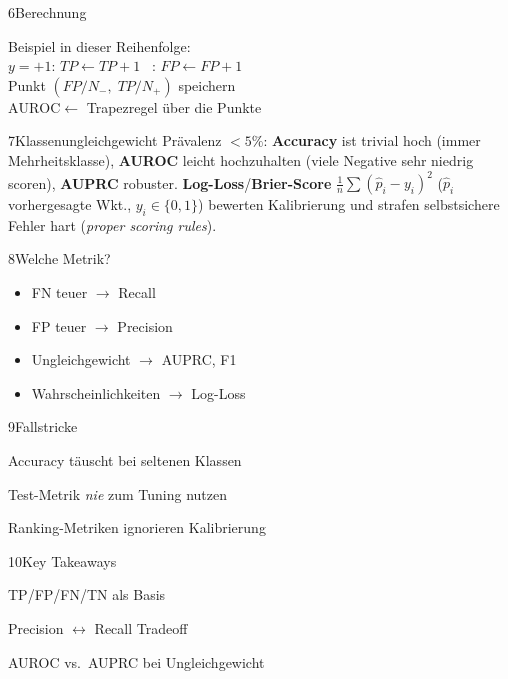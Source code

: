 \begin{hngrid}
\begin{hnp}[raster multicolumn=3,acc=hnrose]{6}{Berechnung}
\begin{pcode}
 Beispiel in dieser Reihenfolge:\\
\hii {} $y=+1$: $TP\leftarrow TP+1$ \ : $FP\leftarrow FP+1$\\
\hii Punkt $(FP/N_-,\;TP/N_+)$ speichern \ \\
$\mathrm{AUROC}\leftarrow$ Trapezregel über die Punkte
\end{pcode}
\end{hnp}
%
\begin{hnp}[raster multicolumn=2,acc=hnpurple]{7}{Klassenungleichgewicht}
Prävalenz $<5\%$: \textbf{Accuracy} ist trivial hoch (immer Mehrheitsklasse), \textbf{AUROC} leicht hochzuhalten (viele Negative sehr niedrig scoren), \textbf{AUPRC} robuster. \textbf{Log-Loss}/\textbf{Brier-Score} $\frac1n\sum(\hat p_i-y_i)^2$ ($\hat p_i$ vorhergesagte Wkt., $y_i\in\{0,1\}$) bewerten Kalibrierung und strafen selbstsichere Fehler hart (\emph{proper scoring rules}).
\end{hnp}
%
\begin{hnp}[raster multicolumn=2,acc=hnteal]{8}{Welche Metrik?}
\begin{itemize}
\item FN teuer $\to$ Recall
\item FP teuer $\to$ Precision
\item Ungleichgewicht $\to$ AUPRC, F1
\item Wahrscheinlichkeiten $\to$ Log-Loss
\end{itemize}
\end{hnp}
%
\begin{hnp}[raster multicolumn=2,acc=hnred]{9}{Fallstricke}
\begin{hncon}
\item Accuracy täuscht bei seltenen Klassen
\item Test-Metrik \emph{nie} zum Tuning nutzen
\item Ranking-Metriken ignorieren Kalibrierung
\end{hncon}
\end{hnp}
%
\begin{hnp}[raster multicolumn=6,acc=hnorange]{10}{Key Takeaways}
\begin{hnchk}
\item TP/FP/FN/TN als Basis
\item Precision $\leftrightarrow$ Recall Tradeoff
\item AUROC vs.\ AUPRC bei Ungleichgewicht
\end{hnchk}
\end{hnp}

\end{hngrid}

